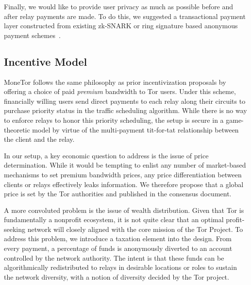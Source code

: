 Finally, we would like to provide user privacy as much as possible before and
after relay payments are made. To do this, we suggested a transactional payment
layer constructed from existing zk-SNARK or ring signature based anonymous
payment schemes~\cite{sasson2014zerocash, van2013cryptonote}.

\subsection{Incentive Model}
MoneTor follows the same philosophy as prior incentivization proposals by
offering a choice of paid \emph{premium} bandwidth to Tor users. Under this
scheme, financially willing users send direct payments to each relay along their
circuits to purchase priority status in the traffic scheduling
algorithm. While there is no way to enforce relays to honor this priority
scheduling, the setup is secure in a game-theoretic model by virtue of the
multi-payment tit-for-tat relationship between the client and the relay.

In our setup, a key economic question to address is the issue of price
determination. While it would be tempting to enlist any number of market-based
mechanisms to set premium bandwidth prices, any price differentiation between
clients or relays effectively leaks information. We therefore propose that a
global price is set by the Tor authorities and published in the consensus
document. 

A more convoluted problem is the issue of wealth distribution. Given that Tor is
fundamentally a nonprofit ecosystem, it is not quite clear that an optimal
profit-seeking network will closely aligned with the core mission of the Tor
Project. To address this problem, we introduce a taxation element into the
design. From every payment, a percentage of funds is anonymously diverted to an
account controlled by the network authority. The intent is that these funds can
be algorithmically redistributed to relays in desirable locations or roles to sustain the network diversity, with a notion of diversity decided by the Tor project.